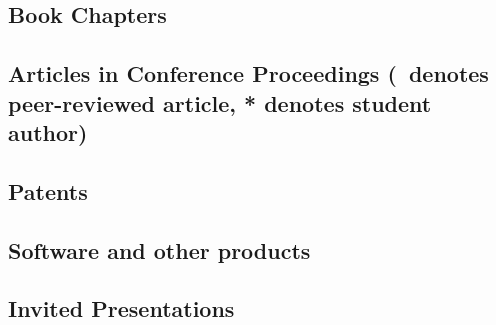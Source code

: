 \documentclass[10pt]{article}
\begin{document}
    \subsection[Book Chapters]{Book Chapters}
    \begin{refsection}
        \nocite{*}
        \printbibliography[heading=none,type=incollection]
    \end{refsection}
  \subsection[Articles in Conference Proceedings]{Articles in Conference Proceedings {\small (\peerrevmark\ denotes peer-reviewed article, * denotes student author)}}
    \begin{refsection}
        \nocite{*}
        \printbibliography[heading=none,type=inproceedings]
    \end{refsection}
  \subsection{Patents}
    \begin{refsection}
        \nocite{*}
        \printbibliography[heading=none,type=patent]
       \end{refsection}
  \subsection{Software and other products}
  
  \subsection{Invited Presentations}
    \begin{enumerate}
    
    
    \end{enumerate}

\end{document}

